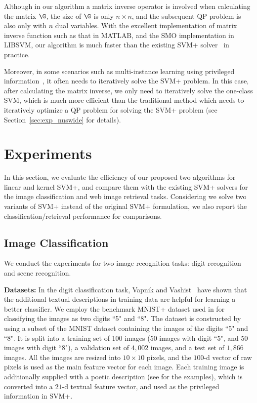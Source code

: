 Although in our algorithm a matrix inverse operator is involved when calculating the matrix $\G$, the size of $\G$ is only $n\times n$, and the subsequent QP problem is also only with $n$ dual variables. With the excellent implementation of matrix inverse function such as that in MATLAB, and the SMO implementation in LIBSVM, our algorithm is much faster than the existing SVM+ solver~\cite{Pechyony2010} in practice.

Moreover, in some scenarios such as multi-instance learning using privileged information~\cite{NiuIJCV2015}, it often needs to iteratively solve the SVM+ problem. In this case, after calculating the matrix inverse, we only need to iteratively solve the one-class SVM, which is much more efficient than the traditional method which needs to iteratively optimize a QP problem for solving the SVM+ problem (see Section~\ref{sec:exp_nuswide} for details).

\section{Experiments}
In this section, we evaluate the efficiency of our proposed two algorithms for linear and kernel SVM+, and compare them with the existing SVM+ solvers for the image classification and web image retrieval tasks. Considering we solve two variants of SVM+ instead of the original SVM+ formulation, we also report the classification/retrieval performance for comparisons.

\subsection{Image Classification}
We conduct the experiments for two image recognition tasks: digit
recognition and scene recognition.

\noindent\textbf{Datasets:}
In the digit classification task, Vapnik and
Vashist~\cite{SVMplus_vapnik} have shown that the additional textual
descriptions in training data are helpful for learning a better
classifier.  We employ the benchmark MNIST+ dataset used in
\cite{SVMplus_vapnik,Pechyony2010} for classifying the images as two
digits ``5" and ``8". The dataset is constructed by using a subset of
the MNIST dataset containing the images of the digits ``5" and
``8". It is split into a training set of $100$ images ($50$ images
with digit ``5", and 50 images with digit ``8"), a validation set of
$4,002$ images, and a test set of $1,866$ images. All the images are
resized into $10\times 10$ pixels, and the $100$-d vector of raw
pixels is used as the main feature vector for each image. Each
training image is additionally supplied with a poetic description (see
\cite{SVMplus_vapnik} for the examples), which is converted into a
$21$-d textual feature vector, and used as the privileged information
in SVM+.

